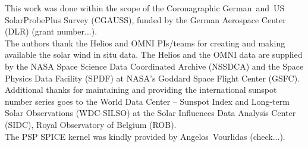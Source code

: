\begin{acknowledgements}
	This work was done within the scope of the Coronagraphic German~and~US SolarProbePlus Survey (CGAUSS), funded by the German Aerospace Center (DLR) (grant number...).\\
	The authors thank the Helios and OMNI PIs/teams for creating and making available the solar wind in situ data. The Helios and the OMNI data are supplied by the NASA Space Science Data Coordinated Archive (NSSDCA) and the Space Physics Data Facility (SPDF) at NASA's Goddard Space Flight Center (GSFC).\\
	Additional thanks for maintaining and providing the international sunspot number series goes to the World Data Center -- Sunspot Index and Long-term Solar Observations (WDC-SILSO) at the Solar Influences Data Analysis Center (SIDC), Royal Observatory of Belgium (ROB).\\
	The PSP SPICE kernel was kindly provided by Angelos~Vourlidas (check...).\\

\end{acknowledgements}
